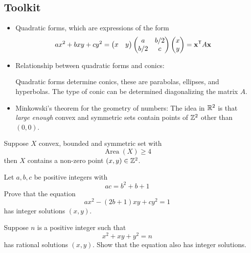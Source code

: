 \documentclass[12pt]{memoir}
\begin{document}
\subsection*{Toolkit}
\begin{itemize}
    \item Quadratic forms, which are expressions of the form 
    $$ax^2+bxy+cy^2=\begin{pmatrix}x&y\end{pmatrix}\begin{pmatrix} a & b/2 \\ b/2 & c \end{pmatrix}\begin{pmatrix} x \\ y \end{pmatrix}=\mathbf{x}^{\mathsf{T}} A\mathbf{x}$$
    \item Relationship between quadratic forms and conics:\par  %
    Quadratic forms determine conics, these are parabolas, ellipses, and hyperbolas. The type of conic can be determined diagonalizing the matrix $A$.
    \item Minkowski's theorem for the geometry of numbers: The idea in $\bR^2$ is that \emph{large enough} convex and symmetric sets contain points of $\mathbb{Z}^2$ other than $(0,0)$.
\end{itemize}

\begin{nonum-Th}[Minkowski on $\bR^2$]
Suppose $X$ convex, bounded and symmetric set with 
$$\operatorname*{Area}(X)\geq 4$$
then $X$ contains a non-zero point $(x,y)\in\mathbb{Z}^2$.
\end{nonum-Th}

\begin{Ej}
    Let $a,b,c$ be positive integers with 
    $$ac=b^2+b+1$$
    Prove that the equation 
    $$ax^2-(2b+1)xy+cy^2=1$$
    has integer solutions $(x,y)$.
\end{Ej}

\begin{Ej}
    Suppose $n$ is a positive integer such that 
    $$x^2+xy+y^2=n$$
    has rational solutions $(x,y)$. Show that the equation also has integer solutions.
\end{Ej}
\end{document}
